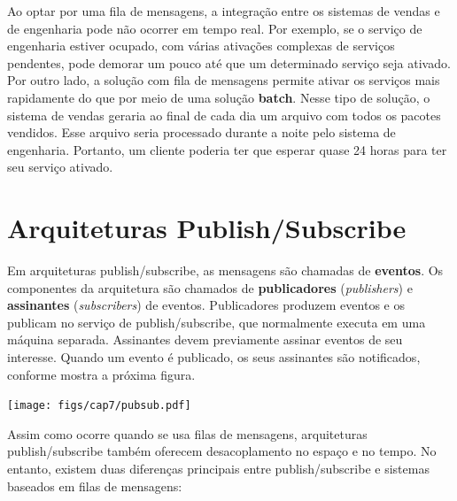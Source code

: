 \documentclass[
  11pt,
  twoside]{book}
\let\origfigure\figure
\let\endorigfigure\endfigure
\renewenvironment{figure}[1][2] {
    \expandafter\origfigure\expandafter[!h]
} {
    \endorigfigure
}
\begin{document}
 Ao optar por uma fila de mensagens, a
integração entre os sistemas de vendas e de engenharia pode não ocorrer
em tempo real. Por exemplo, se o serviço de engenharia estiver ocupado,
com várias ativações complexas de serviços pendentes, pode demorar um
pouco até que um determinado serviço seja ativado. Por outro lado, a
solução com fila de mensagens permite ativar os serviços mais
rapidamente do que por meio de uma solução \textbf{batch}. Nesse tipo de
solução, o sistema de vendas geraria ao final de cada dia um arquivo com
todos os pacotes vendidos. Esse arquivo seria processado durante a noite
pelo sistema de engenharia. Portanto, um cliente poderia ter que esperar
quase 24 horas para ter seu serviço ativado.

\hypertarget{arquiteturas-publishsubscribe}{%
\section{Arquiteturas
Publish/Subscribe}\label{arquiteturas-publishsubscribe}}

 Em arquiteturas publish/subscribe, as
mensagens são chamadas de \textbf{eventos}. Os componentes da
arquitetura são chamados de \textbf{publicadores} (\emph{publishers}) e
\textbf{assinantes} (\emph{subscribers}) de eventos. Publicadores
produzem eventos e os publicam no serviço de publish/subscribe, que
normalmente executa em uma máquina separada. Assinantes devem
previamente assinar eventos de seu interesse. Quando um evento é
publicado, os seus assinantes são notificados, conforme mostra a próxima
figura.

\begin{figure}
\centering
\texttt{[image: figs/cap7/pubsub.pdf]}
\caption{Arquitetura Publish/Subscribe}
\end{figure}

Assim como ocorre quando se usa filas de mensagens, arquiteturas
publish/subscribe também oferecem desacoplamento no espaço e no tempo.
No entanto, existem duas diferenças principais entre publish/subscribe e
sistemas baseados em filas de mensagens:
\end{document}
